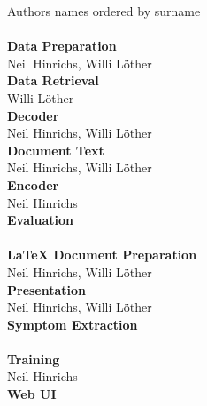 
Authors names ordered by surname\\
\\
\textbf{Data Preparation}\\
Neil Hinrichs, Willi Löther
\\
\textbf{Data Retrieval}\\
Willi Löther
\\
\textbf{Decoder}\\
Neil Hinrichs, Willi Löther
\\
\textbf{Document Text}\\
Neil Hinrichs, Willi Löther
\\
\textbf{Encoder}\\
Neil Hinrichs
\\
\textbf{Evaluation}\\
\\
\textbf{LaTeX Document Preparation}\\
Neil Hinrichs, Willi Löther
\\
\textbf{Presentation}\\
Neil Hinrichs, Willi Löther
\\
\textbf{Symptom Extraction}\\
\\
\textbf{Training}\\
Neil Hinrichs
\\
\textbf{Web UI}\\
\\